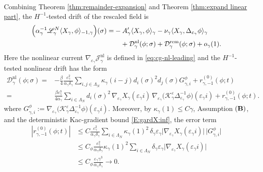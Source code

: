 \documentclass{article}
\begin{document}
Combining Theorem \ref{thm:remainder-expansion} and Theorem \ref{thm:expand linear part}, the \(H^{-1}\)-tested drift of the rescaled field is
\begin{align}
\Bigl(\alpha_\gamma^{-1}\mathscr L_\gamma^N
\langle X_\gamma,\phi\rangle_{-1,\gamma}\Bigr)(\sigma)
=&
-A'_\gamma\langle X_\gamma,\phi\rangle_\gamma
-\nu_\gamma\langle X_\gamma,\Delta_{\varepsilon_\gamma}\phi\rangle_\gamma
\nonumber\\
&\quad
+\mathcal D_\gamma^{\mathrm{nl}}(\phi;\sigma)
+\mathcal D_\gamma^{\mathrm{rem}}(\phi;\sigma)
+o_\gamma(1).
\label{eq:Hminus-one-drift-summary}
\end{align}
Here the nonlinear current $\nabla_{\varepsilon_{\gamma}} \mathcal J_\gamma^{\mathrm{nl}}$ is defined in \eqref{eq:cg-nl-leading} and the \(H^{-1}\)-tested nonlinear drift has the form
\begin{align}\label{eq:Hminus-one-nonlinear-drift}
    \mathcal D_\gamma^{\mathrm{nl}}(\phi;\sigma)
    = & -\frac{\beta}{4}
\frac{\varepsilon_\gamma^2}{\alpha_\gamma\delta_\gamma}
\sum_{i,j\in\Lambda_N}
\kappa_\gamma(i-j)
d_i(\sigma)^2d_j(\sigma) G_{\gamma,i}^{\phi}
+ r_{\gamma,-1}^{(0)}(\phi;t)  \nonumber\\
    = & \frac{\beta\varepsilon_\gamma^3}{4\alpha_\gamma}
    \sum_{i\in\Lambda_N}
    d_i(\sigma)^2\,\nabla_{\varepsilon_\gamma}X_\gamma(\varepsilon_\gamma i)\,
    \nabla_{\varepsilon_\gamma}
    \bigl(\mathcal K_\gamma^\varepsilon\Delta_{\varepsilon_\gamma}^{-1}\phi\bigr)(\varepsilon_\gamma i)
    + r_{\gamma,-1}^{(0)}(\phi;t).
\end{align}
where $G_{\gamma,i}^{\phi}:=
\nabla_{\varepsilon_\gamma}
\bigl(\mathcal K_\gamma^\varepsilon\Delta_{\varepsilon_\gamma}^{-1}\phi\bigr)
(\varepsilon_\gamma i)$.
Moreover, by \(\kappa_\gamma(1)\le C\gamma\),
Assumption \(({\bf B})\), and the deterministic Kac-gradient bound \eqref{E:gardX:inf}, the error term
\begin{align}
|r_{\gamma,-1}^{(0)}(\phi;t)|
&\le
C\frac{\varepsilon_\gamma^2}{\alpha_\gamma\delta_\gamma}
\sum_{i\in\Lambda_N}
\kappa_\gamma(1)^2\,
\delta_\gamma\varepsilon_\gamma
\bigl|\nabla_{\varepsilon_\gamma}X_\gamma(\varepsilon_\gamma i)\bigr|\,
\bigl|G_{\gamma,i}^{\phi}\bigr|
\nonumber\\
&\le
C_\phi
\frac{\varepsilon_\gamma^2}{\alpha_\gamma\delta_\gamma}
\kappa_\gamma(1)^2
\sum_{i\in\Lambda_N}
\delta_\gamma\varepsilon_\gamma
\bigl|\nabla_{\varepsilon_\gamma}X_\gamma(\varepsilon_\gamma i)\bigr|
\nonumber\\
& \le C_\phi \frac{\varepsilon_\gamma\gamma^3}{\alpha_\gamma\delta_\gamma} \to 0.
\label{eq:Hminus-one-nonlinear-error}
\end{align}
\end{document}
